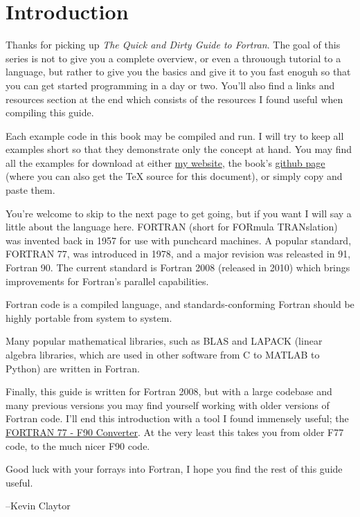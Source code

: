 \section{Introduction}

Thanks for picking up \emph{The Quick and Dirty Guide to Fortran}. 
The goal of this series is not to give you a complete overview, or even a throuough tutorial to a language,
 but rather to give you the basics and give it to you fast enoguh so that you can get started programming in a day or two. 
You'll also find a links and resources section at the end which consists of the resources I found useful when compiling this guide.

Each example code in this book may be compiled and run. I will try to keep all examples short so that they demonstrate only the concept at hand. 
You may find all the examples for download at either
 \href{http://http://people.duke.edu/~kec30/}{my website}, the book's
 \href{http://http://people.duke.edu/~kec30/}{github page} (where you can also get the TeX source for this document), or simply copy and paste them.

You're welcome to skip to the next page to get going, but if you want I will say a little about the language here.
FORTRAN (short for FORmula TRANslation) was invented back in 1957 for use with punchcard machines. 
A popular standard, FORTRAN 77, was introduced in 1978, and a major revision was releasted in 91, Fortran 90. 
The current standard is Fortran 2008 (released in 2010) which brings improvements for Fortran's parallel capabilities.

Fortran code is a compiled language, and standards-conforming Fortran should be highly portable from system to system.

Many popular mathematical libraries, such as BLAS and LAPACK (linear algebra libraries, which are used in other software from C to MATLAB to Python) are written in Fortran.

Finally, this guide is written for Fortran 2008, but with a large codebase and many previous versions you may find yourself
 working with older versions of Fortran code. 
I'll end this introduction with a tool I found immensely useful; the \href{http://www.polyhedron.com/plusfortonline.php}{FORTRAN 77 - F90 Converter}.
 At the very least this takes you from older F77 code, to the much nicer F90 code.

Good luck with your forrays into Fortran, I hope you find the rest of this guide useful.

    --Kevin Claytor